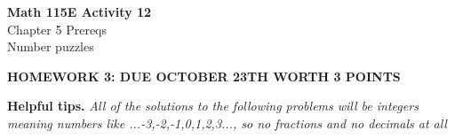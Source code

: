 \documentclass[12pt]{article}
\begin{document}
\begin{center}
    \Large \textbf{Math 115E Activity 12} \\
    \vspace{0.2cm}
    \normalsize Chapter 5 Prereqs \\
    \normalsize Number puzzles
\end{center}

\textbf{HOMEWORK 3: DUE OCTOBER 23TH WORTH 3 POINTS}
\begin{tcolorbox}[
    width=\linewidth,
    colframe=black,         %
    colback=white,          %
    boxrule=0.5pt,          %
    left=1mm, right=1.1mm,    %
    top=1mm, bottom=1mm,    %
    arc=2mm                 %
]
\textbf{Helpful tips.} 
\textit{All of the solutions to the following problems will be integers\\
meaning numbers like ...-3,-2,-1,0,1,2,3..., so no fractions and no decimals at all}
\end{tcolorbox}
\end{document}
